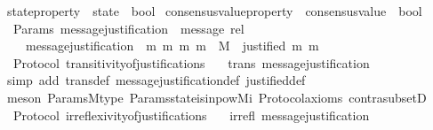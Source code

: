 \begin{isabellebody}
\isanewline
\isanewline
{}\isamarkupfalse%
\ state{\isacharunderscore}property\ {\isacharequal}\ {\isachardoublequoteopen}state\ {\isasymRightarrow}\ bool{\isachardoublequoteclose}\isanewline
\isanewline
\isanewline
{}\isamarkupfalse%
\ consensus{\isacharunderscore}value{\isacharunderscore}property\ {\isacharequal}\ {\isachardoublequoteopen}consensus{\isacharunderscore}value\ {\isasymRightarrow}\ bool{\isachardoublequoteclose}\isanewline
\isanewline
\isanewline
\isanewline
\isanewline
\isanewline
\isanewline
{}\isamarkupfalse%
\ {\isacharparenleft}\ Params{\isacharparenright}\ message{\isacharunderscore}justification\ {\isacharcolon}{\isacharcolon}\ {\isachardoublequoteopen}message\ rel{\isachardoublequoteclose}\isanewline
\ \ \ \isanewline
\ \ \ \ {\isachardoublequoteopen}message{\isacharunderscore}justification\ {\isacharequal}\ {\isacharbraceleft}{\isacharparenleft}m{}{\isacharcomma}\ m{}{\isacharparenright}{\isachardot}\ {\isacharbraceleft}m{}{\isacharcomma}\ m{}{\isacharbraceright}\ {\isasymsubseteq}\ M\ {\isasymand}\ justified\ m{}\ m{}{\isacharbraceright}{\isachardoublequoteclose}\ \isanewline
\isanewline
{}\isamarkupfalse%
\ {\isacharparenleft}\ Protocol{\isacharparenright}\ transitivity{\isacharunderscore}of{\isacharunderscore}justifications\ {\isacharcolon}\isanewline
\ \ {\isachardoublequoteopen}trans\ message{\isacharunderscore}justification{\isachardoublequoteclose}\isanewline
%
\isadelimproof
\ \ %
\endisadelimproof
%
\isatagproof
{}\isamarkupfalse%
\ {\isacharparenleft}simp\ add{\isacharcolon}\ trans{\isacharunderscore}def\ message{\isacharunderscore}justification{\isacharunderscore}def\ justified{\isacharunderscore}def{\isacharparenright}\isanewline
\ \ \isamarkupfalse%
\ {\isacharparenleft}meson\ Params{\isachardot}M{\isacharunderscore}type\ Params{\isachardot}state{\isacharunderscore}is{\isacharunderscore}in{\isacharunderscore}pow{\isacharunderscore}M{\isacharunderscore}i\ Protocol{\isacharunderscore}axioms\ contra{\isacharunderscore}subsetD{\isacharparenright}%
\endisatagproof
{\isafoldproof}%
%
\isadelimproof
\isanewline
%
\endisadelimproof
\isanewline
{}\isamarkupfalse%
\ {\isacharparenleft}\ Protocol{\isacharparenright}\ irreflexivity{\isacharunderscore}of{\isacharunderscore}justifications\ {\isacharcolon}\isanewline
\ \ {\isachardoublequoteopen}irrefl\ message{\isacharunderscore}justification{\isachardoublequoteclose}\isanewline

\end{isabellebody}
